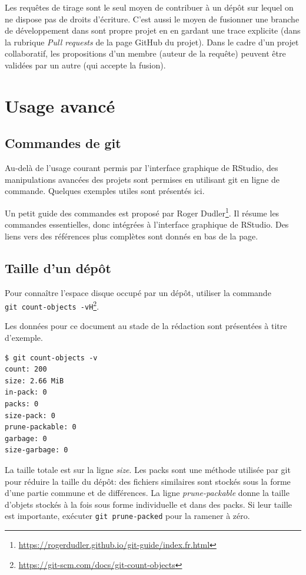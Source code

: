 \documentclass[
  11pt,
  french,
  a4paper,
  extrafontsizes,onecolumn,openright
  ]{memoir}
\begin{document}
Les requêtes de tirage sont le seul moyen de contribuer à un dépôt sur lequel on ne dispose pas de droits d'écriture.
C'est aussi le moyen de fusionner une branche de développement dans sont propre projet en en gardant une trace explicite (dans la rubrique \emph{Pull requests} de la page GitHub du projet).
Dans le cadre d'un projet collaboratif, les propositions d'un membre (auteur de la requête) peuvent être validées par un autre (qui accepte la fusion).

\hypertarget{usage-avancuxe9}{%
\section{Usage avancé}\label{usage-avancuxe9}}

\hypertarget{commandes-de-git}{%
\subsection{Commandes de git}\label{commandes-de-git}}

Au-delà de l'usage courant permis par l'interface graphique de RStudio, des manipulations avancées des projets sont permises en utilisant git en ligne de commande.
Quelques exemples utiles sont présentés ici.

Un petit guide des commandes est proposé par Roger Dudler\footnote{\url{https://rogerdudler.github.io/git-guide/index.fr.html}}.
Il résume les commandes essentielles, donc intégrées à l'interface graphique de RStudio.
Des liens vers des références plus complètes sont donnés en bas de la page.

\hypertarget{taille-dun-duxe9puxf4t}{%
\subsection{Taille d'un dépôt}\label{taille-dun-duxe9puxf4t}}

Pour connaître l'espace disque occupé par un dépôt, utiliser la commande \texttt{git\ count-objects\ -vH}\footnote{\url{https://git-scm.com/docs/git-count-objects}}.

Les données pour ce document au stade de la rédaction sont présentées à titre d'exemple.

\begin{verbatim}
$ git count-objects -v
count: 200
size: 2.66 MiB
in-pack: 0
packs: 0
size-pack: 0
prune-packable: 0
garbage: 0
size-garbage: 0
\end{verbatim}

La taille totale est sur la ligne \emph{size}.
Les packs sont une méthode utilisée par git pour réduire la taille du dépôt: des fichiers similaires sont stockés sous la forme d'une partie commune et de différences.
La ligne \emph{prune-packable} donne la taille d'objets stockés à la fois sous forme individuelle et dans des packs.
Si leur taille est importante, exécuter \texttt{git\ prune-packed} pour la ramener à zéro.
\end{document}
